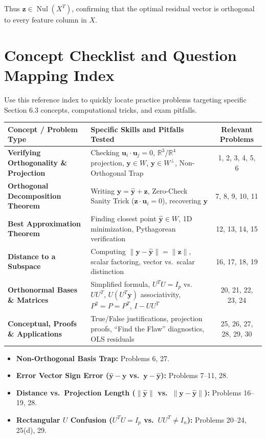 \documentclass[11pt, letterpaper]{article}
\theoremstyle{definition}
\theoremstyle{remark}
\newcommand{\R}{\mathbb{R}}
\begin{document}
Thus $\mathbf{z} \in \operatorname{Nul}(X^T)$, confirming that the optimal residual vector is orthogonal to every feature column in $X$.

\newpage

\section{Concept Checklist and Question Mapping Index}

Use this reference index to quickly locate practice problems targeting specific Section 6.3 concepts, computational tricks, and exam pitfalls.

\renewcommand{\arraystretch}{1.5}
\begin{tabularx}{\textwidth}{>{\bfseries}l X c}
\toprule
Concept / Problem Type & Specific Skills and Pitfalls Tested & Relevant Problems \\
\midrule
Verifying Orthogonality \& Projection & Checking $\mathbf{u}_i \cdot \mathbf{u}_j = 0$, $\R^3$/$\R^4$ projection, $\mathbf{y} \in W$, $\mathbf{y} \in W^\perp$, Non-Orthogonal Trap & 1, 2, 3, 4, 5, 6 \\
Orthogonal Decomposition Theorem & Writing $\mathbf{y} = \hat{\mathbf{y}} + \mathbf{z}$, Zero-Check Sanity Trick ($\mathbf{z} \cdot \mathbf{u}_i = 0$), recovering $\mathbf{y}$ & 7, 8, 9, 10, 11 \\
Best Approximation Theorem & Finding closest point $\hat{\mathbf{y}} \in W$, 1D minimization, Pythagorean verification & 12, 13, 14, 15 \\
Distance to a Subspace & Computing $\|\mathbf{y} - \hat{\mathbf{y}}\| = \|\mathbf{z}\|$, scalar factoring, vector vs.\ scalar distinction & 16, 17, 18, 19 \\
Orthonormal Bases \& Matrices & Simplified formula, $U^T U = I_p$ vs.\ $UU^T$, $U(U^T \mathbf{y})$ associativity, $P^2 = P = P^T$, $I - UU^T$ & 20, 21, 22, 23, 24 \\
Conceptual, Proofs \& Applications & True/False justifications, projection proofs, ``Find the Flaw'' diagnostics, OLS residuals & 25, 26, 27, 28, 29, 30 \\
\bottomrule
\end{tabularx}

\begin{description}[style=nextline, leftmargin=1.5em, labelindent=0em]
    \item[Exam Diagnostic Cross-Reference]
    \begin{itemize}
        \item \textbf{Non-Orthogonal Basis Trap:} Problems 6, 27.
        \item \textbf{Error Vector Sign Error ($\hat{\mathbf{y}} - \mathbf{y}$ vs.\ $\mathbf{y} - \hat{\mathbf{y}}$):} Problems 7--11, 28.
        \item \textbf{Distance vs.\ Projection Length ($\|\hat{\mathbf{y}}\|$ vs.\ $\|\mathbf{y} - \hat{\mathbf{y}}\|$):} Problems 16--19, 28.
        \item \textbf{Rectangular $U$ Confusion ($U^T U = I_p$ vs.\ $UU^T \neq I_n$):} Problems 20--24, 25(d), 29.
    \end{itemize}
\end{description}
\end{document}
